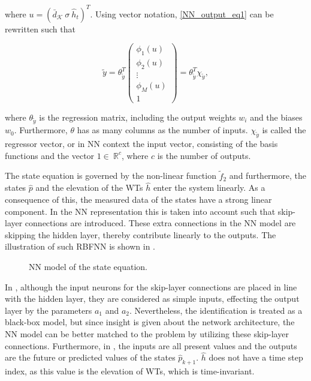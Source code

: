 where $u = (\bar{d}_{\mathcal{K}} \ \sigma \ \hat{h}_t )^T$. Using vector notation, \eqref{NN_output_eq1} can be rewritten such that

  \begin{equation}
\label{NN_output_vector1}
\tilde{y} = \theta^T_{\tilde{y}} 
          \begin{pmatrix}
           \phi_1(u) \\[1pt]
           \phi_2(u) \\[1pt]
           \vdots \\[1pt]
           \phi_M(u)\\[3pt]
           1 
         \end{pmatrix}
         =
         \theta^T_{\tilde{y}} \chi_{\tilde{y}},
\end{equation}

where $\theta_{\tilde{y}}$ is the regression matrix, including the output weights $w_i$ and the biases $w_0$. Furthermore, $\theta$ has as many columns as the number of inputs. $\chi_{\tilde{y}}$ is called the regressor vector, or in NN context the input vector, consisting of the basis functions and the vector $1 \in \: \mathbb{R}^{c} $, where $c$ is the number of outputs. 

The state equation is governed by the non-linear function $\tilde{f}_2$ and furthermore, the states $\hat{p}$ and the elevation of the WTs $\hat{h}$ enter the system linearly. As a consequence of this, the measured data of the states have a strong linear component. In the NN representation this is taken into account such that skip-layer connections are introduced. These extra connections in the NN model are skipping the hidden layer, thereby contribute linearly to the outputs. The illustration of such RBFNN is shown in .

 \begin{figure}[H]
 \centering
  
 \caption{NN model of the state equation.}
 \label{fig:nn_state}
 \end{figure}

 \vspace{-3mm}

 In , although the input neurons for the skip-layer connections are placed in line with the hidden layer, they are considered as simple inputs, effecting the output layer by the parameters $a_1$ and $a_2$. Nevertheless, the identification is treated as a black-box model, but since insight is given about the network architecture, the NN model can be better matched to the problem by utilizing these skip-layer connections. Furthermore, in , the inputs are all present values and the outputs are the future or predicted values of the states $\hat{p}_{k+1}$. $\hat{h}$ does not have a time step index, as this value is the elevation of WTs, which is time-invariant. 

